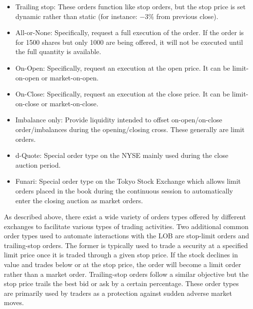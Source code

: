 \begin{itemize}
\item Trailing stop: These orders function like stop orders, but the stop price is set dynamic rather than static (for instance: $-3\%$ from previous close).

\item All-or-None: Specifically, request a full execution of the order. If the order is for 1500 shares but only 1000 are being offered, it will not be executed until the full quantity is available.

\item On-Open: Specifically, request an execution at the open price. It can be limit-on-open or market-on-open.

\item On-Close: Specifically, request an execution at the close price. It can be limit-on-close or market-on-close.

\item Imbalance only: Provide liquidity intended to offset on-open/on-close order/imbalances during the opening/closing cross. These generally are limit orders.

\item d-Quote: Special order type on the NYSE mainly used during the close auction period.

\item Funari: Special order type on the Tokyo Stock Exchange which allows limit orders placed in the book during the continuous session to automatically enter the closing auction as market orders. 
\end{itemize}


As described above, there exist a wide variety of orders types offered by different exchanges to facilitate various types of trading activities. Two additional common order types used to automate interactions with the LOB are stop-limit orders and trailing-stop orders. The former is typically used to trade a security at a specified limit price once it is traded through a given stop price. If the stock declines in value and trades below or at the stop price, the order will become a limit order rather than a market order. Trailing-stop orders follow a similar objective but the stop price trails the best bid or ask by a certain percentage. These order types are primarily used by traders as a protection against sudden adverse market moves. \twomedskip


